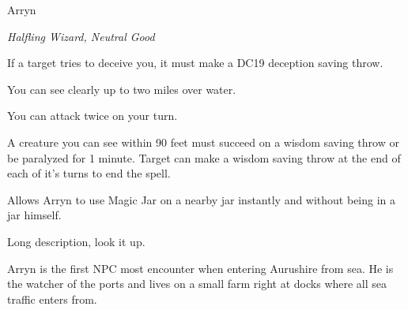 \begin{monsterbox}{Arryn}
	\begin{hangingpar}
		\textit{Halfling Wizard, Neutral Good}
	\end{hangingpar}
	\dndline%
	\basics[%
	armorclass = 17,
	hitpoints  = 172,
	speed      = 40 ft
	]
	\dndline%
	\stats[
	STR = \stat{12}, %
	DEX = \stat{12},
	CON = \stat{16},
	INT = \stat{20},
	WIS = \stat{18},
	CHA = \stat{18}
	]
	\dndline%
	\details[%
	languages = {Common, Elvish, Dwarvish, Gnomish, Halfling, Orc, Pandaren},
	challenge = 10
	]
	\dndline%
	\begin{monsteraction}
		If a target tries to deceive you, it must make a DC19 deception saving throw.
	\end{monsteraction}	
	\begin{monsteraction}
		You can see clearly up to two miles over water.
	\end{monsteraction}
	\begin{monsteraction}
		You can attack twice on your turn.
	\end{monsteraction}
	\begin{monsteraction}
		A creature you can see within 90 feet must succeed on a wisdom saving throw or be paralyzed for 1 minute. Target can make a wisdom saving throw at the end of each of it's turns to end the spell.
	\end{monsteraction}
	\begin{monsteraction}
		Allows Arryn to use Magic Jar on a nearby jar instantly and without being in a jar himself.
	\end{monsteraction}
	\begin{monsteraction}
		Long description, look it up.
	\end{monsteraction}
	Arryn is the first NPC most encounter when entering Aurushire from sea. He is the watcher of the ports and lives on a small farm right at docks where all sea traffic enters from.
\end{monsterbox}

